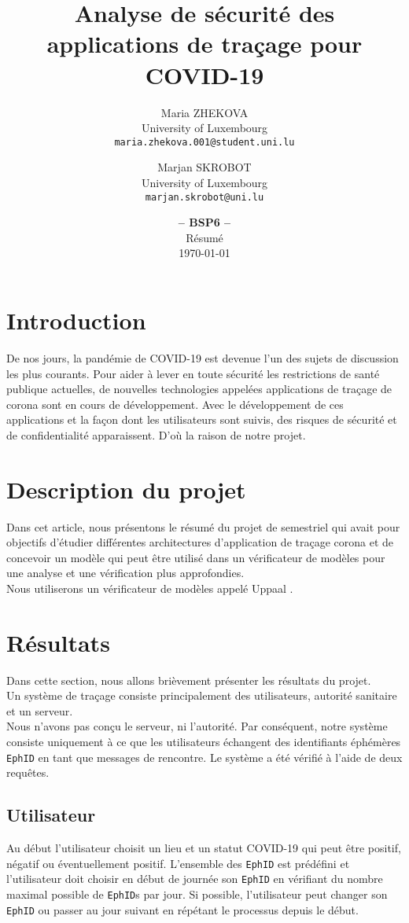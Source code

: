 \documentclass[a4paper, twocolumn]{article}
\title{\textbf{Analyse de sécurité des applications de traçage pour COVID-19}}
\date{\textbf{-- BSP6 --}\\Résumé\\ \today}
\author{
    Maria ZHEKOVA\\
    \small University of Luxembourg\\
    \small\texttt{maria.zhekova.001@student.uni.lu}
	\and
    Marjan SKROBOT\\
    \small University of Luxembourg\\
	\small\texttt{marjan.skrobot@uni.lu}
}
\begin{document}
\maketitle

\section{Introduction}
 De nos jours, la pandémie de COVID-19 est devenue l'un des sujets de discussion les plus courants. Pour aider à lever en toute sécurité les restrictions de santé publique actuelles, de nouvelles technologies appelées applications de traçage de corona sont en cours de développement. Avec le développement de ces applications et la façon dont les utilisateurs sont suivis, des risques de sécurité et de confidentialité apparaissent. D'où la raison de notre projet.
\section{Description du projet}
Dans cet article, nous présentons le résumé du projet de semestriel qui avait pour objectifs d'étudier différentes architectures d'application de traçage corona et de concevoir un modèle qui peut être utilisé dans un vérificateur de modèles pour une analyse et une vérification plus approfondies.\\ 
Nous utiliserons un vérificateur de modèles appelé Uppaal \cite{uppaal}. 

\section{Résultats} 
Dans cette section, nous allons brièvement présenter les résultats du projet.\\
Un système de traçage consiste principalement des utilisateurs, autorité sanitaire et un serveur.\\
Nous n'avons pas conçu le serveur, ni l'autorité. Par conséquent, notre système consiste uniquement à ce que les utilisateurs échangent des identifiants éphémères \texttt{EphID} en tant que messages de rencontre. Le système a été vérifié à l'aide de deux requêtes.
\subsection{Utilisateur}
Au début l'utilisateur choisit un lieu et un statut COVID-19 qui peut être positif, négatif ou éventuellement positif. L'ensemble des \texttt{EphID} est prédéfini et l'utilisateur doit choisir en début de journée son \texttt{EphID} en vérifiant du nombre maximal possible de \texttt{EphID}s par jour. Si possible, l'utilisateur peut changer son \texttt{EphID} ou passer au jour suivant en répétant le processus depuis le début.
\end{document}
